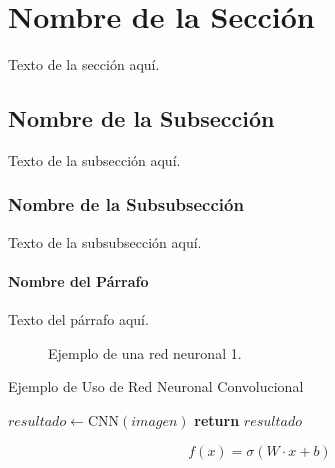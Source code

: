 
\section{Nombre de la Sección}
Texto de la sección aquí.

\subsection{Nombre de la Subsección}
Texto de la subsección aquí.

\subsubsection{Nombre de la Subsubsección}
Texto de la subsubsección aquí.

\paragraph{Nombre del Párrafo}
Texto del párrafo aquí.

\begin{figure}[ht]
    \centering
    \caption[Ejemplo de una red neuronal]{Ejemplo de una red neuronal 1.}
    \label{fig:red-neuronal}
\end{figure}

\begin{algorithm}
    \caption{Ejemplo de Uso de Red Neuronal Convolucional}
    \begin{algorithmic}[1]
            \State $resultado \gets \text{CNN}(imagen)$
            \State \textbf{return} $resultado$
        \EndProcedure
    \end{algorithmic}
    \label{alg:cnn}
\end{algorithm}

\begin{equation}
    f(x) = \sigma(W \cdot x + b)
    \label{eq:funcion_activacion}
\end{equation}

